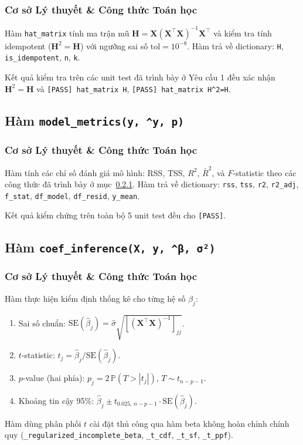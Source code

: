 \subsubsection{Cơ sở Lý thuyết \& Công thức Toán học}

Hàm \texttt{hat\_matrix} tính ma trận mũ
$\mathbf{H} = \mathbf{X}(\mathbf{X}^\top\mathbf{X})^{-1}\mathbf{X}^\top$
và kiểm tra tính idempotent ($\mathbf{H}^2 = \mathbf{H}$) với ngưỡng sai số
$\mathrm{tol} = 10^{-8}$.
Hàm trả về dictionary: \texttt{H}, \texttt{is\_idempotent}, \texttt{n}, \texttt{k}.

Kết quả kiểm tra trên các unit test đã trình bày ở Yêu cầu 1 đều xác nhận
$\mathbf{H}^2 = \mathbf{H}$ và \texttt{[PASS] hat\_matrix H}, \texttt{[PASS] hat\_matrix H\textasciicircum2=H}.

\subsection{Hàm \texttt{model\_metrics(y, \^{}y, p)}}

\subsubsection{Cơ sở Lý thuyết \& Công thức Toán học}

Hàm tính các chỉ số đánh giá mô hình: RSS, TSS, $R^2$, $\bar{R}^2$, và
$F$-statistic theo các công thức đã trình bày ở mục~\ref{}.
Hàm trả về dictionary: \texttt{rss}, \texttt{tss}, \texttt{r2}, \texttt{r2\_adj},
\texttt{f\_stat}, \texttt{df\_model}, \texttt{df\_resid}, \texttt{y\_mean}.

Kết quả kiểm chứng trên toàn bộ 5 unit test đều cho \texttt{[PASS]}.

\subsection{Hàm \texttt{coef\_inference(X, y, \^{}β, σ²)}}

\subsubsection{Cơ sở Lý thuyết \& Công thức Toán học}

Hàm thực hiện kiểm định thống kê cho từng hệ số $\beta_j$:
\begin{enumerate}
    \item Sai số chuẩn: $\mathrm{SE}(\hat{\beta}_j) = \hat{\sigma}\sqrt{[(\mathbf{X}^\top\mathbf{X})^{-1}]_{jj}}$.
    \item $t$-statistic: $t_j = \hat{\beta}_j / \mathrm{SE}(\hat{\beta}_j)$.
    \item $p$-value (hai phía): $p_j = 2\,\mathbb{P}(T > |t_j|)$, $T \sim t_{n-p-1}$.
    \item Khoảng tin cậy 95\%: $\hat{\beta}_j \pm t_{0.025,\,n-p-1} \cdot \mathrm{SE}(\hat{\beta}_j)$.
\end{enumerate}
Hàm dùng phân phối $t$ cài đặt thủ công qua hàm beta không hoàn chỉnh chính quy
(\texttt{\_regularized\_incomplete\_beta}, \texttt{\_t\_cdf}, \texttt{\_t\_sf},
\texttt{\_t\_ppf}).

